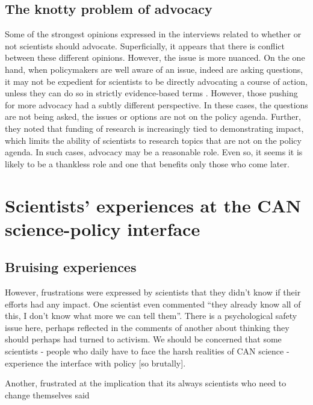 \subsection{The knotty problem of advocacy}\label{sec:disadvocacy}
Some of the strongest opinions expressed in the interviews related to whether or not scientists should advocate. Superficially, it appears that there is conflict between these different opinions. However, the issue is more nuanced. On the one hand, when policymakers are well aware of an issue, indeed are asking questions, it may not be expedient for scientists to be directly advocating a course of action, unless they can do so in strictly evidence-based terms %
. However, those pushing for more advocacy had a subtly different perspective. In these cases, the questions are not being asked, the issues or options are not on the policy agenda. Further, they noted that funding of research is increasingly tied to demonstrating impact, which limits the ability of scientists to research topics that are not on the policy agenda. In such cases, advocacy may be a reasonable role. Even so, it seems it is likely to be a thankless role and one that benefits only those who come later. 

\section{Scientists' experiences at the CAN science-policy interface}\label{sec:disexperience}

\subsection{Bruising experiences}\label{sec:disbruise}
However, frustrations were expressed by scientists that they didn't know if their efforts had any impact. One scientist even commented ``they already know all of this, I don't know what more we can tell them''. There is a psychological safety issue here, perhaps reflected in the comments of another about thinking they should perhaps had turned to activism. We should be concerned that some scientists - people who daily have to face the harsh realities of CAN science - experience the interface with policy [so brutally].

Another, frustrated at the implication that its always scientists who need to change themselves said 

